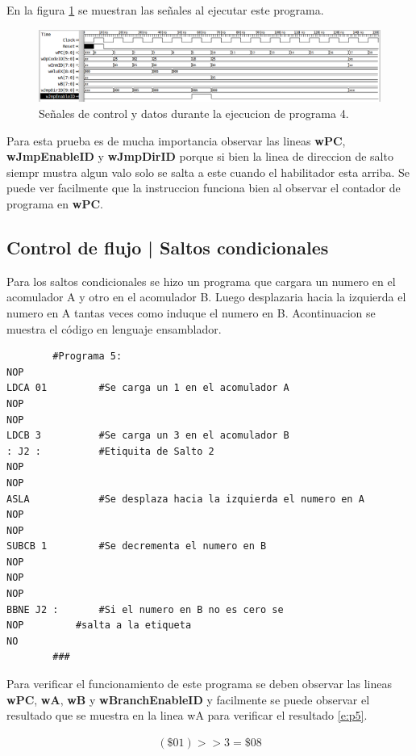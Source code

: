 \documentclass[paper=letter, fontsize=12pt]{article}
\begin{document}
En la figura \ref{i:p4} se muestran las señales al ejecutar este programa.\\

\begin{figure}[hbtp]
\centering
\includegraphics[width=1\linewidth]{../test/Prog4.png}
\caption{Señales de control y datos durante la ejecucion de programa 4.}
\label{i:p4}
\end{figure}

Para esta prueba es de mucha importancia observar las lineas \textbf{wPC}, \textbf{wJmpEnableID} y \textbf{wJmpDirID} porque si bien la linea de direccion de salto siempr mustra algun valo solo se salta a este cuando el habilitador esta arriba. Se puede ver facilmente que la instruccion funciona bien al observar el contador de programa en \textbf{wPC}.

\subsection{Control de flujo | Saltos condicionales}

Para los saltos condicionales se hizo un programa que cargara un numero en el acomulador A y otro en el acomulador B. Luego desplazaria hacia la izquierda el numero en A tantas veces como induque el numero en B. Acontinuacion se muestra el código en lenguaje ensamblador.

\begin{lstlisting}
		#Programa 5:
NOP
LDCA 01			#Se carga un 1 en el acomulador A
NOP
NOP
LDCB 3			#Se carga un 3 en el acomulador B
: J2 :			#Etiquita de Salto 2
NOP
NOP
ASLA			#Se desplaza hacia la izquierda el numero en A
NOP
NOP
SUBCB 1			#Se decrementa el numero en B
NOP
NOP
NOP
BBNE J2 :		#Si el numero en B no es cero se 
NOP			#salta a la etiqueta
NO
		###
\end{lstlisting}

Para verificar el funcionamiento de este programa se deben observar las lineas \textbf{wPC}, \textbf{wA}, \textbf{wB} y \textbf{wBranchEnableID} y facilmente se puede observar el resultado que se muestra en la linea wA para verificar el resultado \ref{e:p5}.

\begin{align} 
\label{e:p5}
(\$01) >> 3 = \$08
\end{align}
\end{document}
